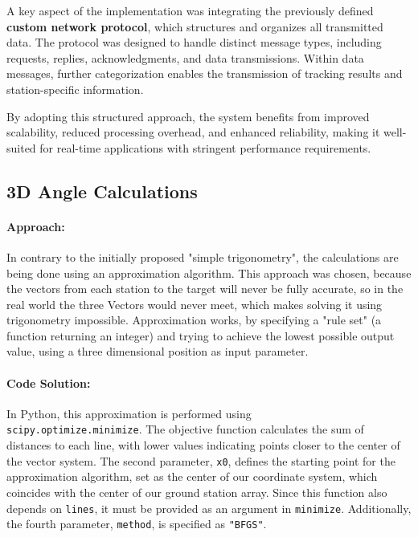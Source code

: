 A key aspect of the implementation was integrating the previously defined \textbf{custom network protocol}, which structures and organizes all transmitted data. The protocol was designed to handle distinct message types, including requests, replies, acknowledgments, and data transmissions. Within data messages, further categorization enables the transmission of tracking results and station-specific information.  

By adopting this structured approach, the system benefits from improved scalability, reduced processing overhead, and enhanced reliability, making it well-suited for real-time applications with stringent performance requirements.  


\subsection{3D Angle Calculations}
\paragraph{Approach:}
In contrary to the initially proposed "simple trigonometry", the calculations are being done using an approximation algorithm. This approach was chosen, because the vectors from each station to the target will never be fully accurate, so in the real world the three Vectors would never meet, which makes solving it using trigonometry impossible. Approximation works, by specifying a "rule set" (a function returning an integer) and trying to achieve the lowest possible output value, using a three dimensional position as input parameter. 

\paragraph{Code Solution:}
In Python, this approximation is performed using \\ \texttt{scipy.optimize.minimize}. The objective function calculates the sum of distances to each line, with lower values indicating points closer to the center of the vector system. The second parameter, \texttt{x0}, defines the starting point for the approximation algorithm, set as the center of our coordinate system, which coincides with the center of our ground station array. Since this function also depends on \texttt{lines}, it must be provided as an argument in \texttt{minimize}. Additionally, the fourth parameter, \texttt{method}, is specified as \texttt{"BFGS"}.

